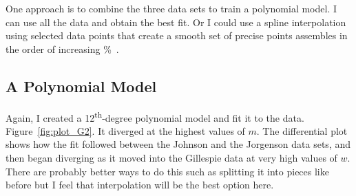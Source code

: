 \documentclass[]{tufte-handout}
\newcommand{\tss}[1]{\textsuperscript{#1}}
\begin{document}
One approach is to combine the three data sets to train a polynomial model. I can use all the data and obtain the best fit. Or I could use a spline interpolation using selected data points that create a smooth set of precise points assembles in the order of increasing \unit{\percent{}}. 
\clearpage
\subsection{A Polynomial Model}

Again, I created a 12\tss{th}-degree polynomial model and fit it to the data. Figure~\vref{fig:plot_G2}. It diverged at the highest values of $m$. The differential plot shows how the fit followed between the Johnson and the Jorgenson data sets, and then began diverging as it moved into the Gillespie data at very high values of $w$. There are probably better ways to do this such as splitting it into pieces like before but I feel that interpolation will be the best option here.
\end{document}
